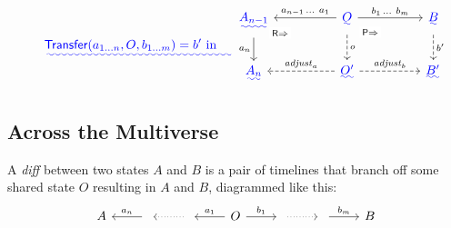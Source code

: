 \documentclass[english,submission]{programming}
\theoremstyle{definition}
\newcommand{\mathbox}[1]{\colorbox{black!10}{$#1$\phantom{i\hspace{-3.5pt}}}}
\providecommand{\DIFadd}[1]{{\protect\color{blue}\uwave{#1}}} %
\providecommand{\DIFaddbegin}{} %
\providecommand{\DIFaddend}{} %
\providecommand{\DIFaddFL}[1]{\DIFadd{#1}} %
\begin{document}
\DIFaddbegin \begin{figure}[]
  \vspace{-20pt}
\[
\DIFaddFL{\textsf{Transfer}(a_{1\ldots n}, O, b_{1\ldots m}) = b' \textrm{ in }\quad
}\begin{tikzcd}[column sep = huge]
	\DIFaddFL{A_{n-1} }& \DIFaddFL{O }& \DIFaddFL{B }\\
	\DIFaddFL{A_n }& {\DIFaddFL{O'}} & {\DIFaddFL{B'}}
	\DIFaddFL{\arrow["{a_n}"', from=1-1, to=2-1]
	\arrow["{\textsf{R}\Rightarrow}"{description, pos=0.1}, draw=none, from=1-1, to=2-2]
	\arrow["{a_{n-1}\,\ldots\  a_1}"', from=1-2, to=1-1]
	\arrow["{b_1\,\ldots \  b_m}", from=1-2, to=1-3]
	\arrow["o", dashed, from=1-2, to=2-2]
	\arrow["{\textsf{P}\Rightarrow}"{description, pos=0.2}, draw=none, from=1-2, to=2-3]
	\arrow["{b'}", dashed, from=1-3, to=2-3]
	\arrow["{\mathit{adjust}_a}"', dashed, from=2-2, to=2-1]
	\arrow["{\mathit{adjust}_b}", dashed, from=2-2, to=2-3]
}\end{tikzcd}\DIFaddFL{}\]
\vspace{-16pt}
\caption{\DIFaddFL{Transfer}}
\label{fig:transfer}
\end{figure}


\DIFaddend \subsection{Across the Multiverse}\label{transfer}

  A \textit{diff} between two states \mathbox{A} and \mathbox{B} is a pair of timelines that branch off some shared state \mathbox{O} resulting in \mathbox{A} and \mathbox{B}, diagrammed like this:
\[\begin{tikzcd}
	A & {} & {} & O & {} & {} & B
	\arrow["{{a_n}}"', from=1-2, to=1-1]
	\arrow[dotted, from=1-3, to=1-2]
	\arrow["{{a_1}}"', from=1-4, to=1-3]
	\arrow["{b_1}", from=1-4, to=1-5]
	\arrow[dotted, from=1-5, to=1-6]
	\arrow["{b_m}", from=1-6, to=1-7]
\end{tikzcd}\]
\end{document}
